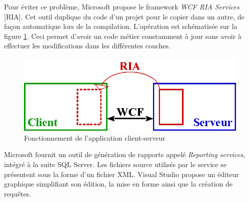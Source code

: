 Pour éviter ce problème, Microsoft propose le framework \textit{WCF RIA Services} [RIA].
Cet outil duplique du code d'un projet pour le copier dans un autre, de façon automatique lors de la compilation.
L'opération est schématisée sur la figure \ref{WCF_RIA_Services}.
Ceci permet d'avoir un code métier constamment à jour sans avoir à effectuer les modifications dans les différentes couches.
\begin{figure}[!h]
	\center
	\includegraphics[width=1\textwidth]{img/WCF_RIA_Services.png}
	\caption{Fonctionnement de l'application client-serveur}
	\label{WCF_RIA_Services}
\end{figure}



Microsoft fournit un outil de génération de rapports appelé \textit{Reporting services}, intégré à la suite SQL Server.
Les fichiers source utilisés par le service se présentent sous la forme d'un fichier XML.
Visual Studio propose un éditeur graphique simplifiant son édition, la mise en forme ainsi que la création de requêtes.
\\

